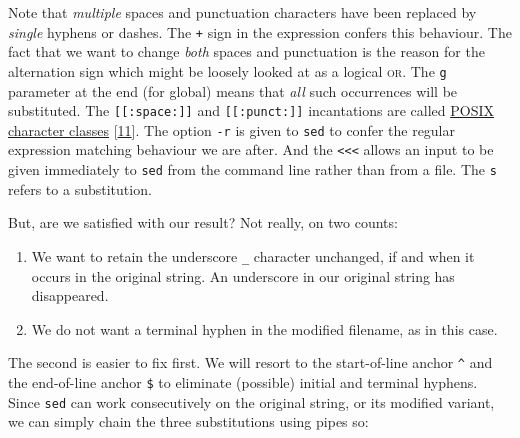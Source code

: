 \documentclass[
  a4paper,
]{article}
\newenvironment{Shaded}{\begin{snugshade}}{\end{snugshade}}
\newcommand{\AttributeTok}[1]{\textcolor[rgb]{0.80,0.80,0.80}{#1}}
\newcommand{\DataTypeTok}[1]{\textcolor[rgb]{0.87,0.87,0.75}{#1}}
\newcommand{\FunctionTok}[1]{\textcolor[rgb]{0.94,0.94,0.56}{#1}}
\newcommand{\KeywordTok}[1]{\textcolor[rgb]{0.94,0.87,0.69}{#1}}
\newcommand{\OperatorTok}[1]{\textcolor[rgb]{0.94,0.94,0.82}{#1}}
\newcommand{\StringTok}[1]{\textcolor[rgb]{0.80,0.58,0.58}{#1}}
\providecommand{\tightlist}{%
  \setlength{\itemsep}{0pt}\setlength{\parskip}{0pt}}
\begin{document}
Note that \emph{multiple} spaces and punctuation characters have been
replaced by \emph{single} hyphens or dashes. The \texttt{+} sign in the
expression confers this behaviour. The fact that we want to change
\emph{both} spaces and punctuation is the reason for the
\texttt{\textbar{}} alternation sign which might be loosely looked at as
a logical \textsc{or}. The \texttt{g} parameter at the end (for global)
means that \emph{all} such occurrences will be substituted. The
\texttt{{[}{[}:space:{]}{]}} and \texttt{{[}{[}:punct:{]}{]}}
incantations are called
\href{https://www.regular-expressions.info/posixbrackets.html}{POSIX
character classes} {[}\protect\hyperlink{ref-posixcharclass}{11}{]}. The
option \texttt{-r} is given to \texttt{sed} to confer the regular
expression matching behaviour we are after. And the
\texttt{\textless{}\textless{}\textless{}} allows an input to be given
immediately to \texttt{sed} from the command line rather than from a
file. The \texttt{s} refers to a substitution.

But, are we satisfied with our result? Not really, on two counts:

\begin{enumerate}
\tightlist
\item
  We want to retain the underscore \texttt{\_} character unchanged, if
  and when it occurs in the original string. An underscore in our
  original string has disappeared.
\item
  We do not want a terminal hyphen in the modified filename, as in this
  case.
\end{enumerate}

The second is easier to fix first. We will resort to the start-of-line
anchor \texttt{\^{}} and the end-of-line anchor \texttt{\$} to eliminate
(possible) initial and terminal hyphens. Since \texttt{sed} can work
consecutively on the original string, or its modified variant, we can
simply chain the three substitutions using pipes so:

\begin{Shaded}
\end{Shaded}
\end{document}
